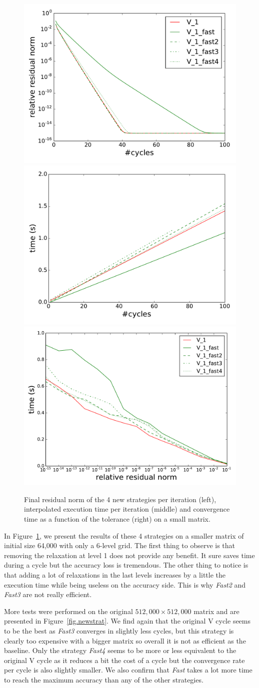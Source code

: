   \begin{figure}
  \includegraphics[width=0.33\linewidth]{figs/convergence_fast_small_norm.pdf}
  \includegraphics[width=0.33\linewidth]{figs/convergence_fast_small_time.pdf}
   \includegraphics[width=0.33\linewidth]{figs/time_convergence_fast_small.pdf}
  \caption{Final residual norm of the 4 new strategies per iteration (left), interpolated execution time per iteration (middle) and convergence time as a function of the tolerance (right) on a small matrix.}
   \label{fig.newstrat_small}
  \end{figure}

  In Figure~\ref{fig.newstrat_small}, we present the results of these 4 strategies on a smaller matrix of initial size 64,000 with only a 6-level grid.
  The first thing to observe is that removing the relaxation at level 1 does not provide any benefit. It sure saves time during a cycle but the accuracy loss is tremendous.
  The other thing to notice is that adding a lot of relaxations in the last levels increases by a little the execution time while being useless on the accuracy side. This is why \emph{Fast2} and  \emph{Fast3} are not really efficient.
  
  More tests were performed on the original $512,000\times 512,000$ matrix and are presented in Figure~\ref{fig.newstrat}. We find again that the original V cycle seems to be the best as \emph{Fast3} converges in slightly less cycles, but this strategy is clearly too expensive with a bigger matrix so overall it is not as efficient as the baseline. Only the strategy \emph{Fast4} seems to be more or less equivalent to the original V cycle as it reduces a bit the cost of a cycle but the convergence rate per cycle is also slightly smaller. We also confirm that \emph{Fast} takes a lot more time to reach the maximum accuracy than any of the other strategies.
  
